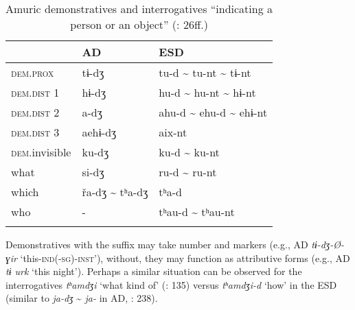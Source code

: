 \begin{table}
\caption{Amuric demonstratives and interrogatives “indicating a person or an object” (\citealt{Gruzdeva1998}: 26ff.)}
\label{tab:amur:4}

\begin{tabularx}{\textwidth}{XXl}
\lsptoprule
& \textbf{AD} & \textbf{ESD}\\
\midrule
\textsc{dem.prox} & tɨ-dʒ & tu-d {\textasciitilde} tu-nt {\textasciitilde} tɨ-nt\\
\textsc{dem.dist} 1 & hɨ-dʒ & hu-d {\textasciitilde} hu-nt {\textasciitilde} hɨ-nt\\
\textsc{dem.dist} 2 & a-dʒ & ahu-d {\textasciitilde} ehu-d {\textasciitilde} ehɨ-nt\\
\textsc{dem.dist} 3 & aehɨ-dʒ & aix-nt\\
\textsc{dem.}invisible & ku-dʒ & ku-d {\textasciitilde} ku-nt\\
what & si-dʒ & ru-d {\textasciitilde} ru-nt\\
which & řa-dʒ {\textasciitilde} tʰa-dʒ & tʰa-d\\
who & - & tʰau-d {\textasciitilde} tʰau-nt\\
\lspbottomrule
\end{tabularx}
\end{table}

Demonstratives with the suffix may take number and  markers (e.g., AD \textit{tɨ-dʒ-Ø-ɣir} ‘this-\textsc{ind}(-\textsc{sg})-\textsc{inst}’), without, they may function as attributive forms (e.g., AD \textit{tɨ urk} ‘this night’). Perhaps a similar situation can be observed for the interrogatives \textit{tʰ}\textit{amdʒi} ‘what kind of’ (\citealt{ChaeHeekyung2013}: 135) versus \textit{tʰ}\textit{amdʒi-d} ‘how’ \citep[1372]{Fortescue2011} in the ESD (similar to \textit{ja-dʒ} {\textasciitilde} \textit{ja-} in AD, \citealt{Mattissen2003}: 238).

